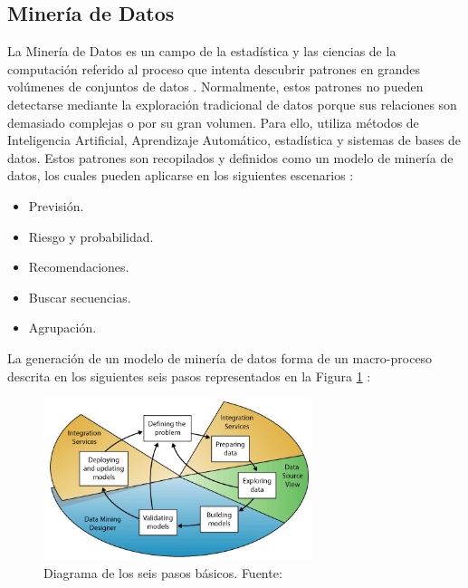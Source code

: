\subsection{Minería de Datos}
La Minería de Datos es un campo de la estadística y las ciencias de la computación referido al proceso que intenta descubrir patrones en grandes volúmenes de conjuntos de datos \parencite{bk_maimon2010datamining}. Normalmente, estos patrones no pueden detectarse mediante la exploración tradicional de datos porque sus relaciones son demasiado complejas o por su gran volumen. Para ello, utiliza métodos de Inteligencia Artificial, Aprendizaje Automático, estadística y sistemas de bases de datos. Estos patrones son recopilados y definidos como un modelo de minería de datos, los cuales pueden aplicarse en los siguientes escenarios \parencite{gl_microsoft2019datamining}:
\begin{itemize}
	\item Previsión.
	\item Riesgo y probabilidad.
	\item Recomendaciones.
	\item Buscar secuencias.
	\item Agrupación.
\end{itemize}

La generación de un modelo de minería de datos forma de un macro-proceso descrita en los siguientes seis pasos representados en la Figura \ref{2:fig7} \parencite{gl_microsoft2019datamining}:
\begin{figure}[h]
	\begin{center}
		\includegraphics[width=0.7\textwidth]{2/figures/data_mining_steps.jpg}
		\caption{Diagrama de los seis pasos básicos. Fuente: \cite{gl_microsoft2019datamining}}
		\label{2:fig7}
	\end{center}
\end{figure}


